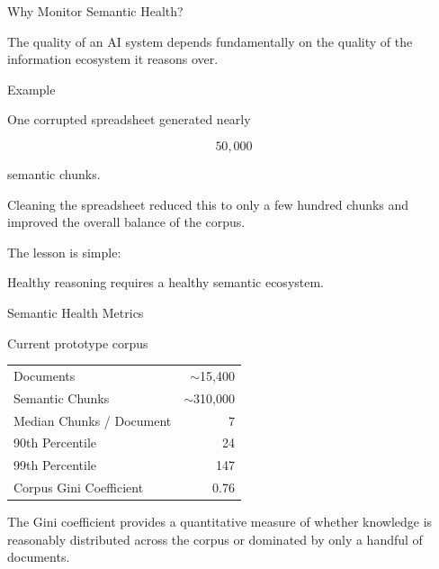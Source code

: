 \documentclass[aspectratio=169]{beamer}
\begin{document}
\begin{frame}{Why Monitor Semantic Health?}

The quality of an AI system depends fundamentally on the quality
of the information ecosystem it reasons over.

\vspace{0.5cm}

\begin{block}{Example}

One corrupted spreadsheet generated nearly

\[
50,\!000
\]

semantic chunks.

Cleaning the spreadsheet reduced this to only a few hundred
chunks and improved the overall balance of the corpus.

\end{block}

\vspace{0.5cm}

The lesson is simple:

\vspace{0.1cm}

\Large

Healthy reasoning requires a healthy semantic ecosystem.

\end{frame}

\begin{frame}{Semantic Health Metrics}

Current prototype corpus

\vspace{0.4cm}

\begin{table}

\begin{tabular}{lr}

\toprule

Documents & $\sim$15,400 \\

Semantic Chunks & $\sim$310,000 \\

Median Chunks / Document & 7 \\

90th Percentile & 24 \\

99th Percentile & 147 \\

Corpus Gini Coefficient & 0.76 \\

\bottomrule

\end{tabular}

\end{table}

\vspace{0.5cm}

The Gini coefficient provides a quantitative measure of whether
knowledge is reasonably distributed across the corpus or dominated
by only a handful of documents.

\end{frame}
\end{document}
